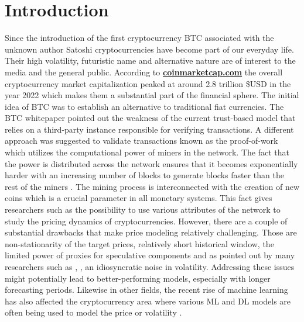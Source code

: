 \chapter{Introduction}
\label{chap:one}

Since the introduction of the first cryptocurrency \ac{BTC}
associated with the unknown author Satoshi \cite{Nakamoto2008} cryptocurrencies
have become part of our everyday life. Their high volatility, futuristic name 
and alternative nature are of interest to the media and the general public.
According to \textbf{\href{https://coinmarketcap.com/charts/}{coinmarketcap.com}}
the overall cryptocurrency market capitalization peaked at around 2.8 trillion \$USD in the year 2022
which makes them a substantial part of the financial sphere.
The initial idea of \ac{BTC} was to establish an alternative to traditional fiat currencies. 
The \ac{BTC} whitepaper
pointed out the weakness of the current trust-based model that relies on a third-party instance responsible
for verifying transactions.
A different approach was suggested to validate transactions known as the proof-of-work which
utilizes the computational power of miners in the network. The fact that the power is 
distributed across the network ensures that it becomes exponentially harder with an increasing number of blocks
to generate blocks faster than the rest of the miners \cite[pg.~6]{Nakamoto2008}. 
The mining process is interconnected with the creation of new coins which is a crucial parameter
in all monetary systems. This fact gives researchers such as \cite{Kukacka2023} 
the possibility to use various attributes of the network to study the pricing dynamics of cryptocurrencies. 
However, there are a couple of substantial drawbacks that make price modeling relatively challenging.
Those are non-stationarity of the target prices, relatively short historical window, the limited power of
proxies for speculative components and as pointed out by many researchers 
such as \cite{Bouri2022}, \cite{Dimpfl2021}, \cite{Watorek2023} an idiosyncratic noise in volatility.
Addressing these issues might potentially lead to better-performing models, especially
with longer forecasting periods. Likewise in other fields, the recent rise of machine learning 
has also affected the cryptocurrency area where various \ac{ML} and \ac{DL} models 
are often being used 
to model the price \cite{Khedr2021} or volatility \cite{Kristjanpoller2018}. 


